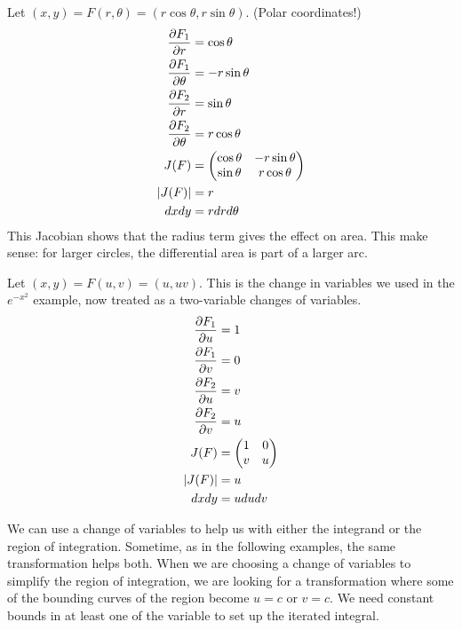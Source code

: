 \documentclass[fleqn,letterpaper]{report}
\begin{document}
\begin{example}
Let $(x,y) = F(r,\theta) = (r \cos \theta, r \sin \theta)$.
(Polar coordinates!)
\begin{align*}
\frac{\partial F_1}{\partial r} & = \cos \theta \\
\frac{\partial F_1}{\partial \theta} & = -r\sin \theta \\
\frac{\partial F_2}{\partial r} & = \sin \theta \\
\frac{\partial F_2}{\partial \theta} & = r \cos \theta \\
J(F) & = \left( \begin{matrix} \cos \theta & - r \sin \theta
\\ \sin \theta & r \cos \theta \end{matrix} \right) \\
|J(F)| & = r \\
dx dy & = r dr d\theta
\end{align*} 
This Jacobian shows that the radius term gives the effect on
area. This make sense: for larger circles, the differential
area is part of a larger arc.
\end{example}

\begin{example}
Let $(x,y) = F(u,v) = (u, uv)$. This is the change in variables we
used in the $e^{-x^2}$ example, now treated as a two-variable
changes of variables.
\begin{align*}
\frac{\partial F_1}{\partial u} & = 1 \\
\frac{\partial F_1}{\partial v} & = 0 \\
\frac{\partial F_2}{\partial u} & = v \\
\frac{\partial F_2}{\partial v} & = u \\
J(F) & = \left( \begin{matrix} 1 & 0 \\ v & u
\end{matrix} \right) \\
|J(F)| & = u \\
dx dy & = u du dv
\end{align*} 
\end{example}

We can use a change of variables to help us with either the
integrand or the region of integration. Sometime, as in the following
examples, the same transformation helps both. When we are
choosing a change of variables to simplify the region of
integration, we are looking for a transformation where some of
the bounding curves of the region become $u=c$ or $v=c$. We
need constant bounds in at least one of the variable to set up
the iterated integral.
\end{document}
